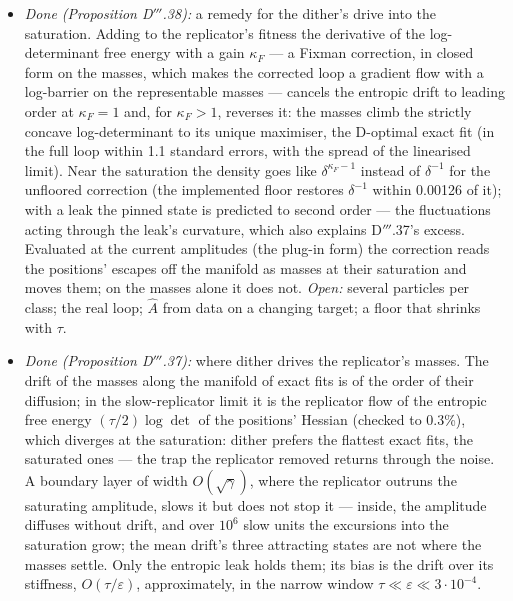 \begin{enumerate}[label=\arabic*.,leftmargin=*]
\begin{itemize}
      within-class masses are neutral at leading order and have their own unbounded direction, the log-ratios).
    \item \emph{Done (Proposition D$'''$.38):} a remedy for the dither's drive into the saturation. Adding to the
      replicator's fitness the derivative of the log-determinant free energy with a gain $\kappa_F$ --- a Fixman
      correction, in closed form on the masses, which makes the corrected loop a gradient flow with a log-barrier on
      the representable masses --- cancels the entropic drift to leading order at $\kappa_F = 1$ and, for
      $\kappa_F > 1$, reverses it: the masses climb the strictly concave log-determinant to its unique maximiser, the
      D-optimal exact fit (in the full loop within 1.1 standard errors, with the spread of the linearised limit). Near
      the saturation the density goes like $\delta^{\kappa_F - 1}$ instead of $\delta^{-1}$ for the unfloored
      correction (the implemented floor restores $\delta^{-1}$ within 0.00126 of it); with a leak the pinned state is
      predicted to second order --- the fluctuations acting through the leak's curvature, which also explains
      D$'''$.37's excess. Evaluated at the current amplitudes (the plug-in form) the correction reads the positions'
      escapes off the manifold as masses at their saturation and moves them; on the masses alone it does not.
      \emph{Open:} several particles per class; the real loop; $\hat A$ from data on a changing target; a floor that
      shrinks with $\tau$.
    \item \emph{Done (Proposition D$'''$.37):} where dither drives the replicator's masses. The drift of the masses
      along the manifold of exact fits is of the order of their diffusion; in the slow-replicator limit it is the
      replicator flow of the entropic free energy $(\tau/2)\log\det$ of the positions' Hessian (checked to 0.3\%),
      which diverges at the saturation: dither prefers the flattest exact fits, the saturated ones --- the trap the
      replicator removed returns through the noise. A boundary layer of width $O(\sqrt\gamma)$, where the replicator
      outruns the saturating amplitude, slows it but does not stop it --- inside, the amplitude diffuses without drift,
      and over $10^6$ slow units the excursions into the saturation grow; the mean drift's three attracting states are
      not where the masses settle. Only the entropic leak holds them; its bias is the drift over its stiffness,
      $O(\tau/\varepsilon)$, approximately, in the narrow window $\tau\ll\varepsilon\ll3\cdot10^{-4}$.

\end{itemize}
\end{enumerate}
